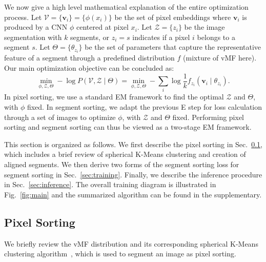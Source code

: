 \documentclass[10pt,twocolumn,letterpaper]{article}
\begin{document}
We now give a high level mathematical explanation of the entire optimization process.
Let $\mathcal{V}=\{\pmb{v}_i\}=\{\phi(x_i)\}$ be the set of pixel embeddings where $\pmb{v}_i$ is produced by a CNN $\phi$ centered at pixel $x_i$. Let $\mathcal{Z}=\{z_i\}$ be the image segmentation with $k$ segments, or $z_i=s$ indicates if a pixel $i$ belongs to a segment $s$. Let $\Theta=\{\theta_{z_i}\}$ be the set of parameters that capture the representative feature of a segment through a predefined distribution $f$ (mixture of vMF here).
Our main optimization objective can be concluded as:
\begin{equation}
\label{eqn:one}
\min_{\phi, \mathcal{Z}, \Theta} -\log P(\mathcal{V}, \mathcal{Z}\mid \Theta) = \min_{\phi, \mathcal{Z}, \Theta} -\sum_i \log \frac{1}{k} f_{z_i}(\pmb{v}_i\mid \theta_{z_i}).
\end{equation}
In pixel sorting, we use a standard EM framework to find the optimal $\mathcal{Z}$ and $\Theta$, with $\phi$ fixed. In segment sorting, we adapt the previous E step for loss calculation through a set of images to optimize $\phi$, with $\mathcal{Z}$ and $\Theta$ fixed. Performing pixel sorting and segment sorting can thus be viewed as a two-stage EM framework.


This section is organized as follows.
We first describe the pixel sorting in Sec.~\ref{sec:clustering}, which includes a brief review of spherical K-Means clustering and creation of aligned segments.
We then derive two forms of the segment sorting loss for segment sorting in Sec.~\ref{sec:training}.
Finally, we describe the inference procedure in Sec.~\ref{sec:inference}.
The overall training diagram is illustrated in Fig.~\ref{fig:main} and the summarized algorithm can be found in the supplementary.





\subsection{Pixel Sorting}
\label{sec:clustering}

We briefly review the vMF distribution and its corresponding spherical K-Means clustering algorithm~\cite{banerjee2005clustering}, which is used to segment an image as pixel sorting.
\end{document}
